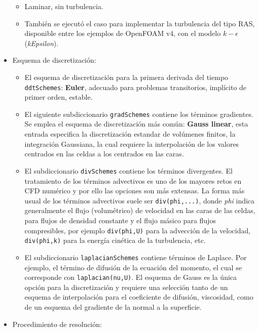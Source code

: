 \begin{itemize}
  \begin{itemize}
  \item
    Laminar, sin turbulencia.
  \item
    También se ejecutó el caso para implementar la turbulencia del tipo
    RAS, disponible entre los ejemplos de OpenFOAM v4, con el modelo
    \(k-\epsilon\) (\emph{kEpsilon}).
  \end{itemize}
\item
  Esquema de discretización:

  \begin{itemize}
  \item
    El esquema de discretización para la primera derivada del tiempo
    \texttt{ddtSchemes}: \textbf{Euler}, adecuado para problemas
    transitorios, implícito de primer orden, estable.
  \item
    El siguiente subdiccionario \lstinline[style=bash]{gradSchemes} contiene los
    términos gradientes. Se emplea el esquema de discretización más
    común: \textbf{Gauss linear}, esta entrada especifica la
    discretización estandar de volúmenes finitos, la integración
    Gaussiana, la cual requiere la interpolación de los valores
    centrados en las celdas a los centrados en las caras.
  \item
    El subdiccionario \lstinline[style=bash]{divSchemes} contiene los términos
    divergentes. El tratamiento de los términos advectivos es uno de los
    mayores retos en CFD numérico y por ello las opciones son más
    extensas. La forma más usual de los términos advectivos suele ser
    \texttt{div(phi,...)}, donde \emph{phi} indica generalmente el flujo
    (volumétrico) de velocidad en las caras de las celdas, para flujos
    de densidad constante y el flujo másico para flujos compresibles,
    por ejemplo \texttt{div(phi,U)} para la advección de la velocidad,
    \texttt{div(phi,k)} para la energía cinética de la turbulencia, etc.
  \item
    El subdiccionario \texttt{laplacianSchemes} contiene términos de
    Laplace. Por ejemplo, el término de difusión de la ecuación del
    momento, el cual se corresponde con \texttt{laplacian(nu,U)}. El
    esquema de Gauss es la única opción para la discretización y
    requiere una selección tanto de un esquema de interpolación para el
    coeficiente de difusión, viscosidad, como de un esquema del
    gradiente de la normal a la superficie.
  \end{itemize}
\item
  Procedimiento de resolución:


\end{itemize}
